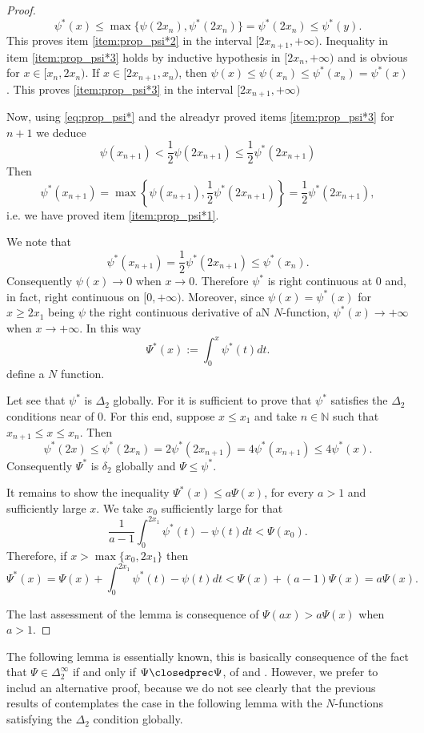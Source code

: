 \documentclass[twoside]{article}
\theoremstyle{remark}
\renewcommand{\leq}{\leqslant}
\renewcommand{\geq}{\geqslant}
\begin{document}
\begin{proof}
\[\psi^*(x)\leq\max\{\psi(2x_n),\psi^*(2x_n)\}=\psi^*(2x_n)\leq\psi^*(y).\]
This proves item \ref{item:prop_psi*2} in the interval $[2x_{n+1},+\infty)$.
Inequality in item \ref{item:prop_psi*3} holds by inductive hypothesis in $[2x_n,+\infty)$ and  is obvious for  $x\in[x_n,2x_n)$. If $ x\in[2x_{n+1},x_n)$, then $\psi(x)\leq\psi(x_n)\leq\psi^*(x_n)=\psi^*(x)$. This proves  \ref{item:prop_psi*3} in the interval $[2x_{n+1},+\infty)$

Now, using \eqref{eq:prop_psi*} and the alreadyr proved items \ref{item:prop_psi*3} for $n+1$ we deduce
\[\psi(x_{n+1})<\frac12\psi(2x_{n+1})\leq \frac12\psi^*(2x_{n+1}) \]
Then
\[\psi^*(x_{n+1})=\max\left\{\psi(x_{n+1}),\frac12\psi^*(2x_{n+1}) \right\}=\frac12\psi^*(2x_{n+1}),\]
i.e. we have proved item \ref{item:prop_psi*1}.

We note that
\[\psi^*(x_{n+1})=\frac12\psi^*(2x_{n+1})\leq\psi^*(x_{n}).\]
Consequently $\psi(x)\to 0$ when $x\to 0$. Therefore $\psi^*$ is right continuous at $0$ and, in fact, right continuous on $[0,+\infty)$. Moreover, since $\psi(x)=\psi^*(x)$ for $x\geq 2x_1$ being $\psi$ the right continuous derivative of aN $N$-function, $\psi^*(x)\to +\infty$ when $x\to +\infty$. In this way
\[\Psi^*(x):=\int_0^x\psi^*(t)dt.\]
define a $N$ function.

Let  see that $\psi^*$ is $\Delta_2$ globally.
For it is sufficient to prove that $\psi^*$ satisfies the $ \Delta_2$ conditions near of $0$. For this end, suppose $x\leq x_1$ and take $n\in\mathbb{N}$ such that $x_{n+1}\leq x\leq x_n$. Then
\[\psi^*(2x)\leq \psi^*(2x_n)=2\psi^*(2x_{n+1})=4\psi^*(x_{n+1})\leq 4\psi^*(x).\]
Consequently $\Psi^*$ is $\delta_2$ globally and $\Psi\leq \psi^*$.

It remains to show the inequality $\Psi^*(x)\leq a\Psi(x)$, for every $a>1$ and sufficiently large $x$. We take $x_0$ sufficiently large for that
\[\frac{1}{a-1}\int_0^{2x_1}\psi^*(t)-\psi(t)dt<\Psi(x_0).\]
Therefore, if  $x>\max\{x_0,2x_1\}$ then
\[\Psi^*(x)=\Psi(x)+\int_0^{2x_1}\psi^*(t)-\psi(t)dt<\Psi(x)+(a-1)\Psi(x)= a\Psi(x).\]

The last assessment of the lemma is consequence of   $\Psi(ax)>a\Psi(x)$ when $a>1$. 

\end{proof}



The following lemma is essentially known,  this is basically consequence  of the fact that $\Psi\in\Delta_2^{\infty}$ if and only if $\Psi\closedprec\Psi$, of  \cite[Prop. 4, p. 20]{rao1991theory} and \cite[Cor. 10, p. 30]{rao1991theory}. However, we prefer to includ an alternative proof, because we do not see clearly that the previous results of \cite{rao1991theory} contemplates the case in the following lemma with the $N$-functions satisfying the $\Delta_2$ condition globally.
\end{document}
